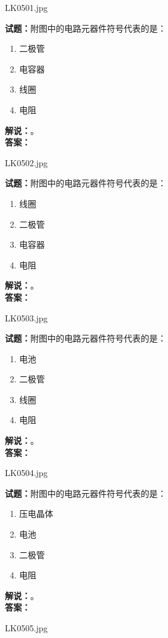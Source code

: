 \documentclass{ctexbook}
\begin{document}
LK0501.jpg

\noindent\textbf{试题：}附图中的电路元器件符号代表的是：
\begin{enumerate}[leftmargin=3em]
  \item 二极管
  \item 电容器
  \item 线圈
  \item 电阻
\end{enumerate}
\noindent\textbf{解说：}\textbf{}。\\\noindent\textbf{答案：}

\bigskip

LK0502.jpg

\noindent\textbf{试题：}附图中的电路元器件符号代表的是：
\begin{enumerate}[leftmargin=3em]
  \item 线圈
  \item 二极管
  \item 电容器
  \item 电阻
\end{enumerate}
\noindent\textbf{解说：}\textbf{}。\\\noindent\textbf{答案：}

\bigskip

LK0503.jpg

\noindent\textbf{试题：}附图中的电路元器件符号代表的是：
\begin{enumerate}[leftmargin=3em]
  \item 电池
  \item 二极管
  \item 线圈
  \item 电阻
\end{enumerate}
\noindent\textbf{解说：}\textbf{}。\\\noindent\textbf{答案：}

\bigskip

LK0504.jpg

\noindent\textbf{试题：}附图中的电路元器件符号代表的是：
\begin{enumerate}[leftmargin=3em]
  \item 压电晶体
  \item 电池
  \item 二极管
  \item 电阻
\end{enumerate}
\noindent\textbf{解说：}\textbf{}。\\\noindent\textbf{答案：}

\bigskip

LK0505.jpg
\end{document}
